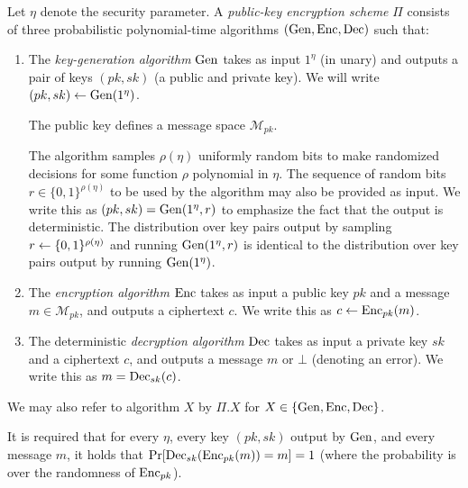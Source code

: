 \begin{definition} \label{def:public-key-encryption}
	Let $\eta$ denote the security parameter.
	A \emph{public-key encryption scheme} $\Pi$ consists of three probabilistic polynomial-time algorithms $(\mathrm{Gen}, \mathrm{Enc}, \mathrm{Dec})$ such that:
	\begin{enumerate}[1.]
		\item The \emph{key-generation algorithm} $\mathrm{Gen}$ takes as input $1^\eta$ (in unary) and outputs a pair of keys $(pk, sk)$ (a public and private key). We will write $(pk, sk) \leftarrow \mathrm{Gen}(1^\eta)$.

		      The public key defines a message space $\mathcal{M}_{pk}$.

		      The algorithm samples $\rho(\eta)$ uniformly random bits to make randomized decisions for some function $\rho$ polynomial in $\eta$. The sequence of random bits $r \in \{0, 1\}^{\rho(\eta)}$ to be used by the algorithm may also be provided as input. We write this as $(pk, sk) = \mathrm{Gen}(1^\eta, r)$ to emphasize the fact that the output is deterministic. The distribution over key pairs output by sampling $r \leftarrow \{0, 1\}^{\rho(\eta)}$ and running $\mathrm{Gen}(1^\eta, r)$ is identical to the distribution over key pairs output by running $\mathrm{Gen}(1^\eta)$.


		\item The \emph{encryption algorithm} $\mathrm{Enc}$ takes as input a public key $pk$ and a message $m \in \mathcal{M}_{pk}$, and outputs a ciphertext $c$. We write this as $c \leftarrow \mathrm{Enc}_{pk}(m)$.
		\item The deterministic \emph{decryption algorithm} $\mathrm{Dec}$ takes as input a private key $sk$ and a ciphertext $c$, and outputs a message $m$ or $\bot$ (denoting an error). We write this as $m = \mathrm{Dec}_{sk}(c)$.
	\end{enumerate}

	We may also refer to algorithm $X$ by $\Pi.X$ for $X \in \{\mathrm{Gen}, \mathrm{Enc}, \mathrm{Dec}\}$.

	It is required that for every $\eta$, every key $(pk, sk)$ output by $\mathrm{Gen}$, and every message $m$, it holds that $\pr{\dec_{sk}(\enc_{pk}(m)) = m} = 1$ (where the probability is over the randomness of $\mathrm{Enc}_{pk}$).
\end{definition}

